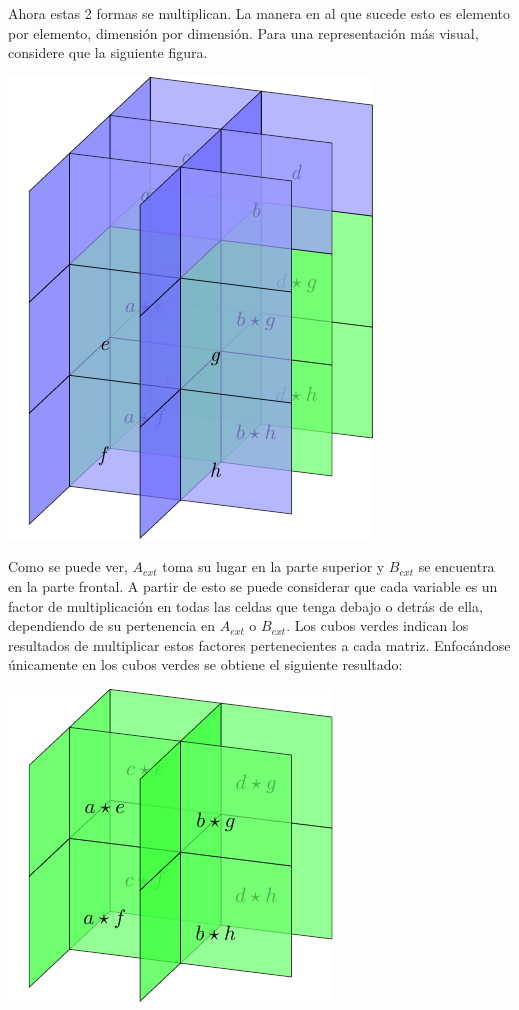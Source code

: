 \documentclass{article}
\begin{document}
Ahora estas 2 formas se multiplican. La manera en al que sucede esto es elemento por elemento, dimensión por dimensión. Para una representación más visual, considere que la siguiente figura.

\begin{center}
    \includegraphics{4.pdf}
\end{center}

Como se puede ver, $A_{ext}$ toma su lugar en la parte superior y $B_{ext}$ se encuentra en la parte frontal. A partir de esto se puede considerar que cada variable es un factor de multiplicación en todas las celdas que tenga debajo o detrás de ella, dependiendo de su pertenencia en $A_{ext}$ o $B_{ext}$. Los cubos verdes indican los resultados de multiplicar estos factores pertenecientes a cada matriz. Enfocándose únicamente en los cubos verdes se obtiene el siguiente resultado:

\begin{center}
    \includegraphics{5.pdf}
\end{center}
\end{document}
